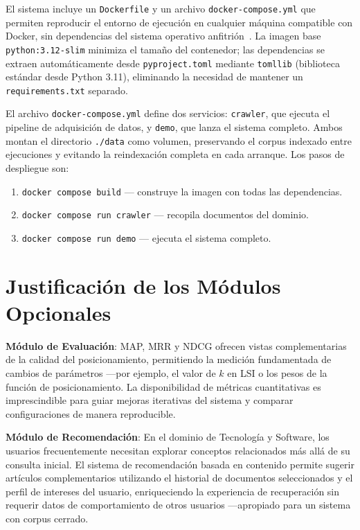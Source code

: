 \documentclass[runningheads,a4paper]{llncs}
\begin{document}
El sistema incluye un \texttt{Dockerfile} y un archivo \texttt{docker-compose.yml} que permiten reproducir el entorno de ejecución en cualquier máquina compatible con Docker, sin dependencias del sistema operativo anfitrión~\cite{merkel2014}. La imagen base \texttt{python:3.12-slim} minimiza el tamaño del contenedor; las dependencias se extraen automáticamente desde \texttt{pyproject.toml} mediante \texttt{tomllib} (biblioteca estándar desde Python 3.11), eliminando la necesidad de mantener un \texttt{requirements.txt} separado.

El archivo \texttt{docker-compose.yml} define dos servicios: \texttt{crawler}, que ejecuta el pipeline de adquisición de datos, y \texttt{demo}, que lanza el sistema completo. Ambos montan el directorio \texttt{./data} como volumen, preservando el corpus indexado entre ejecuciones y evitando la reindexación completa en cada arranque. Los pasos de despliegue son:

\begin{enumerate}
\item \texttt{docker compose build} — construye la imagen con todas las dependencias.
\item \texttt{docker compose run crawler} — recopila documentos del dominio.
\item \texttt{docker compose run demo} — ejecuta el sistema completo.
\end{enumerate}

\section{Justificación de los Módulos Opcionales}

\textbf{Módulo de Evaluación}: MAP, MRR y NDCG ofrecen vistas complementarias de la calidad del posicionamiento, permitiendo la medición fundamentada de cambios de parámetros —por ejemplo, el valor de $k$ en LSI o los pesos de la función de posicionamiento. La disponibilidad de métricas cuantitativas es imprescindible para guiar mejoras iterativas del sistema y comparar configuraciones de manera reproducible.

\textbf{Módulo de Recomendación}: En el dominio de Tecnología y Software, los usuarios frecuentemente necesitan explorar conceptos relacionados más allá de su consulta inicial. El sistema de recomendación basada en contenido permite sugerir artículos complementarios utilizando el historial de documentos seleccionados y el perfil de intereses del usuario, enriqueciendo la experiencia de recuperación sin requerir datos de comportamiento de otros usuarios —apropiado para un sistema con corpus cerrado.
\end{document}
